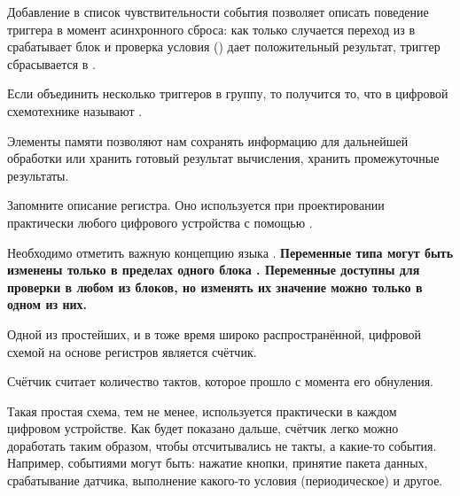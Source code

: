 		
\par{Добавление в список чувствительности события  позволяет описать поведение триггера в момент асинхронного сброса: как только случается переход  из  в  срабатывает блок  и проверка условия  () дает положительный результат, триггер сбрасывается в .}

\par{}

\par{Если объединить несколько триггеров в группу, то получится то, что в цифровой схемотехнике называют .}


		
\par{Элементы памяти позволяют нам сохранять информацию для дальнейшей обработки или хранить готовый результат вычисления, хранить промежуточные результаты.}

\par{Запомните описание регистра. Оно используется при проектировании практически любого цифрового устройства с помощью .}	

\par{Необходимо отметить важную концепцию языка . \textbf{Переменные типа  могут быть изменены только в пределах одного блока . Переменные доступны для проверки в любом из блоков, но изменять их значение можно только в одном из них.}}	



\par{Одной из простейших, и в тоже время широко распространённой, цифровой схемой на основе регистров является счётчик.}

\par{Счётчик считает количество тактов, которое прошло с момента его обнуления.}
		
\par{Такая простая схема, тем не менее, используется практически в каждом цифровом устройстве. Как будет показано дальше, счётчик легко можно доработать таким образом, чтобы отсчитывались не такты, а какие-то события. Например, событиями могут быть: нажатие кнопки, принятие пакета данных, срабатывание датчика, выполнение какого-то условия (периодическое) и другое.}		

